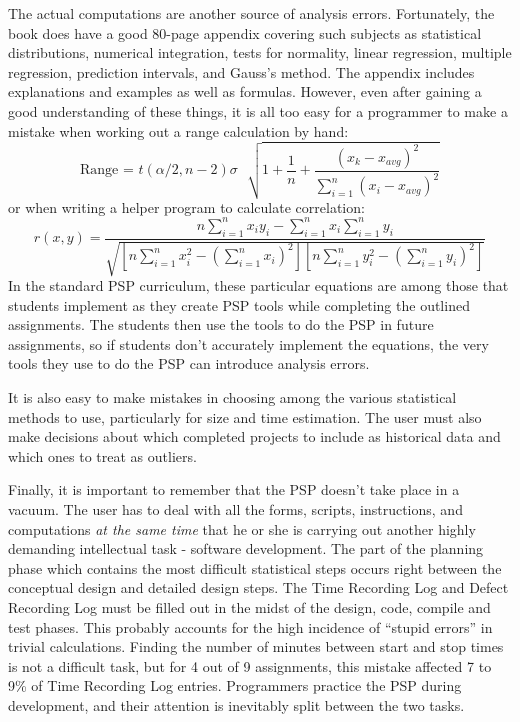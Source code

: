 The actual computations are another source of analysis errors.
Fortunately, the book does have a good 80-page appendix covering such
subjects as statistical distributions, numerical integration, tests for
normality, linear regression, multiple regression, prediction intervals, and
Gauss's method.  The appendix includes explanations and examples as well as
formulas.  However, even after gaining a good understanding of these
things, it is all too easy for a programmer to make a mistake when working
out a range calculation by hand:
\begin{displaymath}
\mbox{Range = }
t(\alpha / 2,n - 2)\sigma  \mbox{ }
\sqrt{1 + \frac{1}{n} + 
\frac{(x_{k} - x_{avg})^{2}}  {\sum_{i=1}^n (x_{i} - x_{avg})^{2}}
}
\end{displaymath}
or when writing a helper program to calculate correlation:
\begin{displaymath}
r(x,y) = \frac{n\sum^n_{i=1}x_iy_i - \sum^n_{i=1} x_i \sum^n_{i=1} y_i}
{\sqrt{
\left[ n\sum^n_{i=1}x^2_i - \left( \sum^n_{i=1}x_i \right)^2\right]
\left[ n\sum^n_{i=1}y^2_i - \left( \sum^n_{i=1}y_i \right)^2\right]
}}
\end{displaymath}
In the standard PSP curriculum, these particular equations are among those
that students implement as they create PSP tools while completing the
outlined assignments.  The students then use the tools to do the PSP in
future assignments, so if students don't accurately implement the
equations, the very tools they use to do the PSP can introduce analysis
errors.

It is also easy to make mistakes in choosing among the various statistical
methods to use, particularly for size and time estimation.  The user must
also make decisions about which completed projects to include as historical
data and which ones to treat as outliers.

Finally, it is important to remember that the PSP doesn't take place in a
vacuum.  The user has to deal with all the forms, scripts, instructions,
and computations {\em at the same time} that he or she is carrying out
another highly demanding intellectual task - software development.  The
part of the planning phase which contains the most difficult statistical
steps occurs right between the conceptual design and detailed design steps.
The Time Recording Log and Defect Recording Log must be filled out in the
midst of the design, code, compile and test phases.  This probably accounts
for the high incidence of ``stupid errors'' in trivial calculations.
Finding the number of minutes between start and stop times is not a
difficult task, but for 4 out of 9 assignments, this mistake affected 7 to
9\% of Time
Recording Log entries. %
Programmers practice the PSP during development, and their attention is
inevitably split between the two tasks.



